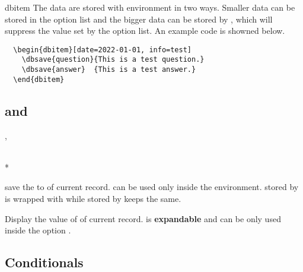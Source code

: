 \documentclass[full]{l3doc}
\begin{document}
\begin{documentation}
\begin{environment}[added=2022-01-05]{dbitem}
  The data are stored with  environment in two ways. Smaller data
  can be stored in the option list and the bigger data can be stored by
  , which will suppress the value set by the option list. An
  example code is showned below.
\end{environment}

\begin{verbatim}
  \begin{dbitem}[date=2022-01-01, info=test]
    \dbsave{question}{This is a test question.}
    \dbsave{answer}  {This is a test answer.}
  \end{dbitem}
\end{verbatim}

\subsection{ and }

\begin{function}[added=2022-01-05, updated=2022-01-08]{\dbsave, \dbsave*}
  \begin{syntax}
        \\
    *  
  \end{syntax}

   save the  to  of current record.
   can be used only inside the  environment.
   stored by  is wrapped with  while
   stored by  keeps the same.
\end{function}

\begin{function}[added=2022-01-05, updated=2022-01-08, EXP]{\dbuse}
  \begin{syntax}
     
  \end{syntax}

  Display the value of  of current record.  is
  \textbf{expandable} and can be only used inside the option .
\end{function}

\subsection{Conditionals}


\end{documentation}
\end{document}
